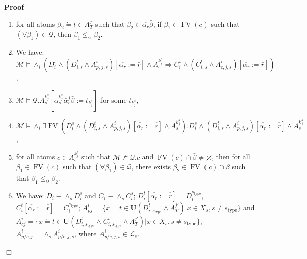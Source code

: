 \documentclass{article}
\newcommand{\assign}{:=}
\newcommand{\tmmathbf}[1]{\ensuremath{\boldsymbol{#1}}}
\newcommand{\tmop}[1]{\ensuremath{\operatorname{#1}}}
\newenvironment{proof}{\noindent\textbf{Proof\ }}{\hspace*{\fill}$\Box$\medskip}
\begin{document}
\begin{proof}
\begin{enumerate}
    \item for all atoms $\beta_2 \dot{=} t \in A_T^j$ such that $\beta_2 \in
    \overline{\overline{\alpha_r}} \bar{\beta}$, if $\beta_1 \in \tmop{FV}
    (c)$ such that $(\forall \beta_1) \in \mathcal{Q}$, then $\beta_1
    \leqslant_{\mathcal{Q}} \beta_2$.
    
    \item We have: $\mathcal{M} \vDash \wedge_i (D_i^s \wedge (D^t_{i, s}
    \wedge A^i_{p, j, s}) [\overline{\overline{\alpha_r}} \assign
    \overline{\bar{r}}] \wedge A_s^{k_j^s} \Rightarrow C_i^s \wedge (C_{i,
    s}^t \wedge A^i_{c, j, s}) [\overline{\overline{\alpha_r}} \assign
    \overline{\bar{r}}])$,
    
    \item $\mathcal{M} \vDash \mathcal{Q}.A_s^{k_j^s} \left[
    \overline{\alpha_s^{k_j^s}} \bar{\alpha}_r^j \bar{\beta} \assign
    \bar{t}_{k_j^s} \right]$ for some $\bar{t}_{k_j^s}$,
    
    \item $\mathcal{M} \vDash \wedge_i \exists \tmop{FV} (D_i^s \wedge
    (D^t_{i, s} \wedge A^i_{p, j, s}) [\overline{\overline{\alpha_r}} \assign
    \overline{\bar{r}}] \wedge A_s^{k_j^s}) .D_i^s \wedge (D^t_{i, s} \wedge
    A^i_{p, j, s}) [\overline{\overline{\alpha_r}} \assign \overline{\bar{r}}]
    \wedge A_s^{k_j^s}$,
    
    \item for all atoms $c \in A_s^{k_j^s}$ such that $\mathcal{M} \nvDash
    \mathcal{Q}.c$ and $\tmop{FV} (c) \cap \bar{\beta} \neq \varnothing$, then
    for all $\beta_1 \in \tmop{FV} (c)$ such that $(\forall \beta_1) \in
    \mathcal{Q}$, there exists $\beta_2 \in \tmop{FV} (c) \cap \bar{\beta}$
    such that $\beta_1 \leqslant_{\mathcal{Q}} \beta_2$.
    
    \item We have: $D_i \equiv \wedge_s D_i^s$ and $C_i \equiv \wedge_s
    C_i^s$; $D_i^t [\overline{\overline{\alpha_r}} \assign \overline{\bar{r}}]
    = D^{s_{\tmop{type}}}_i$, $C_i^t [\overline{\overline{\alpha_r}} \assign
    \overline{\bar{r}}] = C^{s_{\tmop{type}}}_i$; $A^i_{p j} = \{ x \dot{=} t
    \in \tmmathbf{U} (D_{i, s_{\tmop{type}}}^t \wedge A_T^{j\prime}) |x \in
    X_s, s \neq s_{\tmop{type}} \}$ and $A^i_{c j} = \{ x \dot{=} t \in
    \tmmathbf{U} (D_{i, s_{\tmop{type}}}^t \wedge C_{i, s_{\tmop{type}}}^t
    \wedge A_T^{j\prime}) |x \in X_s, s \neq s_{\tmop{type}} \}$, $A^i_{p / c,
    j} = \wedge_s A_{p / c, j, s}^i$, where $A_{p / c, j, s}^i \in
    \mathcal{L}_s$.
    

\end{enumerate}
\end{proof}
\end{document}

